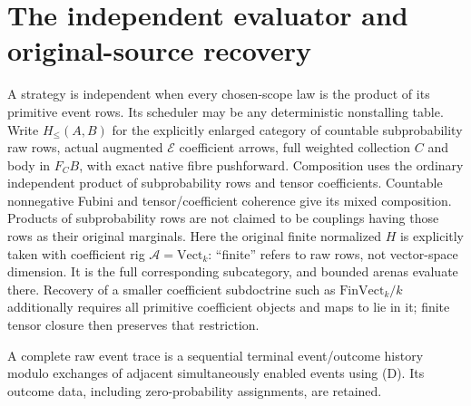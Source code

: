 \documentclass[11pt]{article}
\begin{document}
\section{The independent evaluator and original-source recovery}
A strategy is independent when every chosen-scope law is the product of its primitive event rows. Its scheduler may be any deterministic nonstalling table. Write $H_{\leq}(A,B)$ for the explicitly enlarged category of countable subprobability raw rows, actual augmented $\mathcal E$ coefficient arrows, full weighted collection $C$ and body in $F_CB$, with exact native fibre pushforward. Composition uses the ordinary independent product of subprobability rows and tensor coefficients. Countable nonnegative Fubini and tensor/coefficient coherence give its mixed composition. Products of subprobability rows are not claimed to be couplings having those rows as their original marginals. Here the original finite normalized $H$ is explicitly taken with coefficient rig $\mathcal A=\mathrm{Vect}_k$: ``finite'' refers to raw rows, not vector-space dimension. It is the full corresponding subcategory, and bounded arenas evaluate there. Recovery of a smaller coefficient subdoctrine such as $\mathrm{FinVect}_k/k$ additionally requires all primitive coefficient objects and maps to lie in it; finite tensor closure then preserves that restriction.

A complete raw event trace is a sequential terminal event/outcome history modulo exchanges of adjacent simultaneously enabled events using (D). Its outcome data, including zero-probability assignments, are retained.
\end{document}
